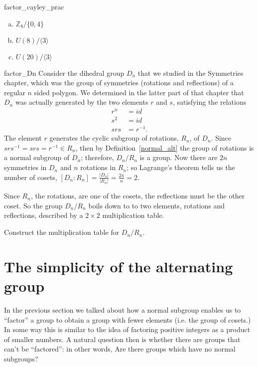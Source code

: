 {\begin{exercise}{factor_cayley_prac}
\begin{multicols}{2}
\begin{enumerate}[(a)]
\item
${\mathbb Z}_{8} / \{0,4\}$
\item
$U(8) / \langle 3 \rangle$
\item
$U(20) / \langle 3 \rangle$

\end{enumerate}
\end{multicols}
\end{exercise}
 
\begin{example}{factor_Dn}
Consider the dihedral group $D_n$ that we studied in the Symmetries chapter, which was the group of symmetries (rotations and reflections) of a regular $n$ sided polygon.  We determined in the latter part of that chapter that $D_n$ was actually generated by the two elements $r$ and $s$, satisfying the relations 
\begin{align*}
r^n & = id \\
s^2 & = id \\
srs & = r^{-1}.
\end{align*}
The element $r$ generates the cyclic subgroup of rotations,
$R_n$, of $D_n$.  Since $srs^{-1} = srs = r^{-1} \in R_n$, then by Definition~\ref{normal_alt} the group
of rotations is a normal subgroup of $D_n$; therefore, $D_n / R_n$ is
a group.  Now there are $2n$ symmetries in $D_n$ and $n$ rotations in $R_n$; so Lagrange's theorem tells us the number of cosets, $[D_n : R_n] =  \frac{|D_n|}{|R_n|} = \frac{2n}{n} =2$.  

Since $R_n$, the rotations, are one of the cosets, the reflections must be the other coset.  So the group $D_n / R_n$ boils down to to two elements, rotations and reflections, described by a $2 \times 2$ multiplication table.  
\end{example}

\begin{exercise}{}
Construct the multiplication table for  $D_n / R_n$. 
\end{exercise}


 
\section{The simplicity of the alternating group}\label{normal:section:simplealternating}
 
 

In the previous section we talked about how a normal subgroup enables us to ``factor'' a group to obtain a group with fewer elements (i.e. the group of cosets.)  In some way this is similar to the idea of factoring positive integers as a product of smaller numbers.  A natural question then is whether there are groups that can't be ``factored'': in other words, Are there groups which have no normal subgroups? 

}
